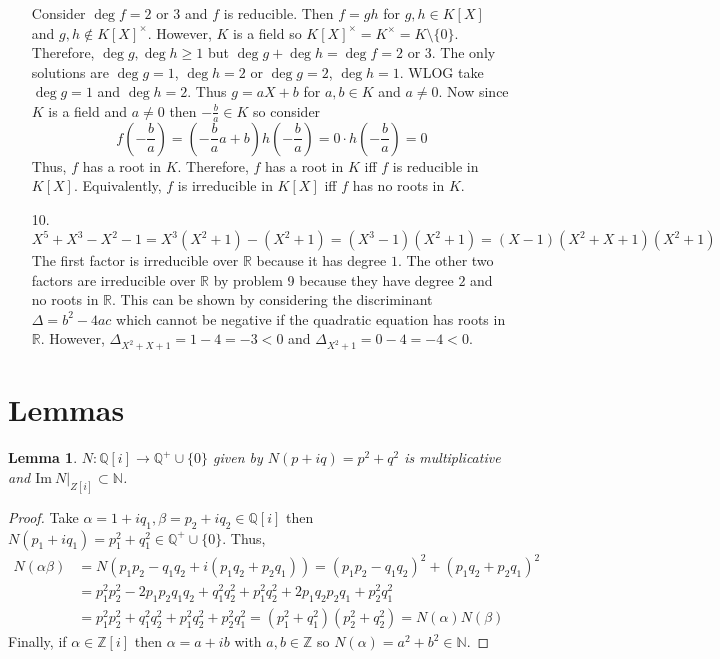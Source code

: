 \documentclass[12pt]{extarticle}
\newcommand{\Z}{\mathbb{Z}}
\newcommand{\N}{\mathbb{N}}
\newcommand{\Q}{\mathbb{Q}}
\newcommand{\R}{\mathbb{R}}
\newcommand{\sm}{\! \setminus \!}
\renewcommand{\Im}[1]{\mathrm{Im} \: #1}
\newtheorem{lemma}[theorem]{Lemma}
\begin{document}
\begin{enumerate}
Consider $\deg{f} = 2$ or $3$ and $f$ is reducible. Then $f = gh$ for $g, h \in K[X]$ and $g,h \notin K[X]^\times$. However, $K$ is a field so $K[X]^\times = K^\times = K \sm \{0\}$. Therefore, $\deg{g}, \deg{h} \ge 1$ but $\deg{g} + \deg{h} = \deg{f} = 2$ or $3$. The only solutions are $\deg{g} = 1$, $\deg{h} = 2$ or $\deg{g} =  2$, $\deg{h} = 1$. WLOG take $\deg{g} = 1$ and $\deg{h} = 2$. Thus $g = aX + b$ for $a, b \in K$ and $a \neq 0$. Now since $K$ is a field and $a \neq 0$ then $-\frac{b}{a} \in K$ so consider \[f \left(-\frac{b}{a} \right) = \left( -\frac{b}{a} a + b \right) h \left(- \frac{b}{a} \right) = 0 \cdot h \left( -\frac{b}{a} \right) = 0\] Thus, $f$ has a root in $K$. Therefore, $f$ has a root in $K$ iff $f$ is reducible in $K[X]$. Equivalently, $f$ is irreducible in $K[X]$ iff $f$ has no roots in $K$. \smallskip

\item[10.] $X^5 + X^3 - X^2 - 1 = X^3(X^2 + 1) - (X^2 + 1) = (X^3 - 1)(X^2 + 1) = (X - 1)(X^2 + X + 1)(X^2 + 1)$ \\ The first factor is irreducible over $\R$ because it has degree $1$. The other two factors are irreducible over $\R$ by problem 9 because they have degree $2$ and no roots in $\R$. This can be shown by considering the discriminant $\Delta = b^2 - 4ac$ which cannot be negative if the quadratic equation has roots in $\R$. However, $\Delta_{X^2 + X + 1} = 1 - 4 = -3 < 0$ and $\Delta_{X^2 + 1} = 0 - 4 = - 4 < 0$.

\end{enumerate}

\section*{Lemmas}

\begin{lemma} \label{normprop} $N : \Q[i] \rightarrow \Q^+ \cup \{0\}$ given by $N(p + iq) = p^2 + q^2$ is multiplicative and $\Im{N|_{Z[i]}} \subset \N$.
\end{lemma}
\begin{proof}
Take $\alpha = 1 + i q_1, \beta = p_2 + i q_2 \in \Q[i]$ then $N(p_1 + i q_1) = p_1^2 + q_1^2 \in \Q^+ \cup \{0\}$. Thus, 
\begin{align*}
N(\alpha \beta) &= N(p_1 p_2 - q_1 q_2 + i(p_1 q_2 + p_2 q_1)) = (p_1 p_2 - q_1 q_2)^2 + (p_1 q_2 + p_2 q_1)^2 \\ &= p_1^2 p_2^2 - 2 p_1 p_2 q_1 q_2 + q_1^2 q_2^2 + p_1^2 q_2^2 + 2 p_1 q_2 p_2 q_1 + p_2^2 q_1^2 \\ &= p_1^2 p_2^2 + q_1^2 q_2^2 + p_1^2 q_2^2 + p_2^2 q_1^2 = (p_1^2 + q_1^2)(p_2^2 + q_2^2) = N(\alpha) N(\beta)
\end{align*}
Finally, if $\alpha \in \Z[i]$ then $\alpha = a + ib$ with $a, b \in \Z$ so $N(\alpha) = a^2 + b^2 \in \N$.
\end{proof}
\end{document}
